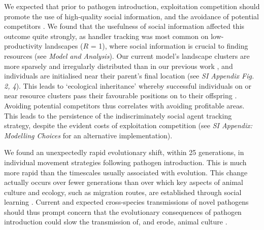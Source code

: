 We expected that prior to pathogen introduction, exploitation competition should promote the use of high-quality social information, and the avoidance of potential competitors \citep[handler tracking][]{gupte2021a}.
We found that the usefulness of social information affected this outcome quite strongly, as handler tracking was most common on low-productivity landscapes ($R$ = 1), where social information is crucial to finding resources (see \textit{Model and Analysis}).
Our current model's landscape clusters are more sparsely and irregularly distributed than in our previous work \citep{gupte2021a}, and individuals are initialised near their parent's final location (see \textit{SI Appendix Fig. 2, 4}).
This leads to `ecological inheritance' whereby successful individuals on or near resource clusters pass their favourable positions on to their offspring \citep{badyaev2009}.
Avoiding potential competitors thus correlates with avoiding profitable areas.
This leads to the persistence of the indiscriminately social agent tracking strategy, despite the evident costs of exploitation competition (see \textit{SI Appendix: Modelling Choices} for an alternative implementation).


We found an unexpectedly rapid evolutionary shift, within 25 generations, in individual movement strategies following pathogen introduction.
This is much more rapid than the timescales usually associated with evolution.
This change actually occurs over fewer generations than over which key aspects of animal culture and ecology, such as migration routes, are established through social learning \citep{jesmer2018,cantor2021}.
Current and expected cross-species transmissions of novel pathogens \citep{carlson2021,pusceddu2021} should thus prompt concern that the evolutionary consequences of pathogen introduction could slow the transmission of, and erode, animal culture \citep{cantor2021}.

